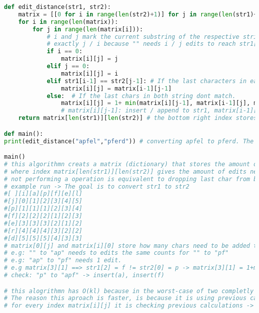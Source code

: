 \begin{lstlisting}[language=Python]
def edit_distance(str1, str2):
	matrix = [[0 for i in range(len(str2)+1)] for j in range(len(str1)+1)]
	for i in range(len(matrix)):
		for j in range(len(matrix[i])):
			# i and j mark the current substring of the respective string. if i or j == 0 than the total amount of edits needed is 
			# exactly j / i because "" needs i / j edits to reach str1[:i] / str2[:j]
			if i == 0:
				matrix[i][j] = j
			elif j == 0:
				matrix[i][j] = i
			elif str1[i-1] == str2[j-1]: # If the last characters in each string match then the required amount of edits to reach that substring is the amount of edits from the previous substring
				matrix[i][j] = matrix[i-1][j-1]
			else:  # If the last chars in both string dont match.
				matrix[i][j] = 1+ min(matrix[i][j-1], matrix[i-1][j], matrix[i-1][j-1])
				# matrix[i][j-1]: insert / append to str1, matrix[i-1][j] remove last char from str1: appending , matrix[i-1][j-1]: replace char in 
	return matrix[len(str1)][len(str2)] # the bottom right index stores the minimal edits needed to convert str1 to str2. 

def main():
print(edit_distance("apfel","pferd")) # converting apfel to pferd. The order of strings matters for the order of operations

main()
# this algorithmn creats a matrix (dictionary) that stores the amount of edits necesarry to convert every substring of str1 to every substring in str2,
# where index matrix[len(str1)][len(str2)] gives the amount of edits needed to convert str1 to str2. operations are always performed on the ast char of str1
# not performing a operation is equivalent to dropping last char from both strings.
# example run -> The goal is to convert str1 to str2
#[ ][i][a][p][f][e][l]
#[j][0][1][2][3][4][5]
#[p][1][1][1][2][3][4]
#[f][2][2][2][1][2][3]
#[e][3][3][3][2][1][2]
#[r][4][4][4][3][2][2]
#[d][5][5][5][4][3][3]
# matrix[0][j] and matrix[i][0] store how many chars need to be added to "" to reach str2 and str1 
# e.g: "" to "ap" needs to edits the same counts for "" to "pf"
# e.g: "ap" to "pf" needs 1 edit. 
# e.g matrix[3][1] ==> str1[2] = f != str2[0] = p -> matrix[3][1] = 1+min(matrix_left,matrix_top,matrix_top_left) = 1+1 = 2 matrix[3][1]
# check: "p" to "apf" -> insert(a), insert(f)

# this alogrithmn has O(kl) because in the worst-case of two completly different strings l operations have to be performed on k chars., where k = len(str1), l = len(str2)
# The reason this aproach is faster, is because it is using previous calculated edits -> recursion for every path no longer needed.
# for every index matrix[i][j] it is checking previous calculations -> lookup O(1)  


\end{lstlisting}
